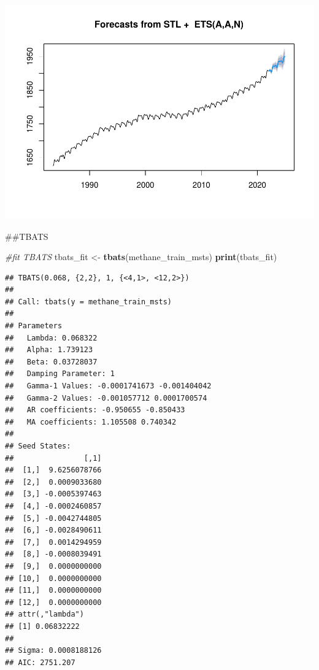 \documentclass[
]{article}
\newenvironment{Shaded}{\begin{snugshade}}{\end{snugshade}}
\newcommand{\AttributeTok}[1]{\textcolor[rgb]{0.13,0.29,0.53}{#1}}
\newcommand{\CommentTok}[1]{\textcolor[rgb]{0.56,0.35,0.01}{\textit{#1}}}
\newcommand{\FunctionTok}[1]{\textcolor[rgb]{0.13,0.29,0.53}{\textbf{#1}}}
\newcommand{\NormalTok}[1]{#1}
\newcommand{\OtherTok}[1]{\textcolor[rgb]{0.56,0.35,0.01}{#1}}
\newcommand{\SpecialCharTok}[1]{\textcolor[rgb]{0.81,0.36,0.00}{\textbf{#1}}}
\begin{document}
\begin{Shaded}
\end{Shaded}

\includegraphics{Methane_Forecasting_files/figure-latex/unnamed-chunk-12-1.pdf}

\#\#TBATS

\begin{Shaded}
\begin{Highlighting}[]
\CommentTok{\#fit TBATS}
\NormalTok{tbats\_fit }\OtherTok{\textless{}{-}} \FunctionTok{tbats}\NormalTok{(methane\_train\_msts)}
\FunctionTok{print}\NormalTok{(tbats\_fit)}
\end{Highlighting}
\end{Shaded}

\begin{verbatim}
## TBATS(0.068, {2,2}, 1, {<4,1>, <12,2>})
## 
## Call: tbats(y = methane_train_msts)
## 
## Parameters
##   Lambda: 0.068322
##   Alpha: 1.739123
##   Beta: 0.03728037
##   Damping Parameter: 1
##   Gamma-1 Values: -0.0001741673 -0.001404042
##   Gamma-2 Values: -0.001057712 0.0001700574
##   AR coefficients: -0.950655 -0.850433
##   MA coefficients: 1.105508 0.740342
## 
## Seed States:
##                [,1]
##  [1,]  9.6256078766
##  [2,]  0.0009033680
##  [3,] -0.0005397463
##  [4,] -0.0002460857
##  [5,] -0.0042744805
##  [6,] -0.0028490611
##  [7,]  0.0014294959
##  [8,] -0.0008039491
##  [9,]  0.0000000000
## [10,]  0.0000000000
## [11,]  0.0000000000
## [12,]  0.0000000000
## attr(,"lambda")
## [1] 0.06832222
## 
## Sigma: 0.0008188126
## AIC: 2751.207
\end{verbatim}
\end{document}
